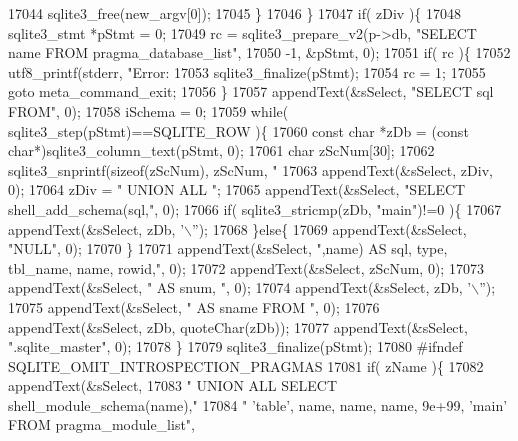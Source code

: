 \begin{DoxyCode}
{{{{{{{{{{{{{{{{{{{{{{{{{{{{{{{{{{{{{{{{{{{{{{{{{{{{{{{{{{{{{{{{{{{{{{{{{{{{{17044         sqlite3_free(new\_argv[0]);
17045       \}
17046     \}
17047     \textcolor{keywordflow}{if}( zDiv )\{
17048       sqlite3_stmt *pStmt = 0;
17049       rc = sqlite3_prepare_v2(p->db, \textcolor{stringliteral}{"SELECT name FROM pragma\_database\_list"},
17050                               -1, &pStmt, 0);
17051       \textcolor{keywordflow}{if}( rc )\{
17052         utf8_printf(stderr, \textcolor{stringliteral}{"Error: %
17053         sqlite3_finalize(pStmt);
17054         rc = 1;
17055         \textcolor{keywordflow}{goto} meta\_command\_exit;
17056       \}
17057       appendText(&sSelect, \textcolor{stringliteral}{"SELECT sql FROM"}, 0);
17058       iSchema = 0;
17059       \textcolor{keywordflow}{while}( sqlite3_step(pStmt)==SQLITE_ROW )\{
17060         \textcolor{keyword}{const} \textcolor{keywordtype}{char} *zDb = (\textcolor{keyword}{const} \textcolor{keywordtype}{char}*)sqlite3_column_text(pStmt, 0);
17061         \textcolor{keywordtype}{char} zScNum[30];
17062         sqlite3_snprintf(\textcolor{keyword}{sizeof}(zScNum), zScNum, \textcolor{stringliteral}{"%
17063         appendText(&sSelect, zDiv, 0);
17064         zDiv = \textcolor{stringliteral}{" UNION ALL "};
17065         appendText(&sSelect, \textcolor{stringliteral}{"SELECT shell\_add\_schema(sql,"}, 0);
17066         \textcolor{keywordflow}{if}( sqlite3_stricmp(zDb, \textcolor{stringliteral}{"main"})!=0 )\{
17067           appendText(&sSelect, zDb, \textcolor{charliteral}{'\(\backslash\)''});
17068         \}\textcolor{keywordflow}{else}\{
17069           appendText(&sSelect, \textcolor{stringliteral}{"NULL"}, 0);
17070         \}
17071         appendText(&sSelect, \textcolor{stringliteral}{",name) AS sql, type, tbl\_name, name, rowid,"}, 0);
17072         appendText(&sSelect, zScNum, 0);
17073         appendText(&sSelect, \textcolor{stringliteral}{" AS snum, "}, 0);
17074         appendText(&sSelect, zDb, \textcolor{charliteral}{'\(\backslash\)''});
17075         appendText(&sSelect, \textcolor{stringliteral}{" AS sname FROM "}, 0);
17076         appendText(&sSelect, zDb, quoteChar(zDb));
17077         appendText(&sSelect, \textcolor{stringliteral}{".sqlite\_master"}, 0);
17078       \}
17079       sqlite3_finalize(pStmt);
17080 \textcolor{preprocessor}{#ifndef SQLITE\_OMIT\_INTROSPECTION\_PRAGMAS}
17081       \textcolor{keywordflow}{if}( zName )\{
17082         appendText(&sSelect,
17083            \textcolor{stringliteral}{" UNION ALL SELECT shell\_module\_schema(name),"}
17084            \textcolor{stringliteral}{" 'table', name, name, name, 9e+99, 'main' FROM pragma\_module\_list"},
}}}}}}}}}}}}}}}}}}}}}}}}}}}}}}}}}}}}}}}}}}}}}}}}}}}}}}}}}}}}}}}}}}}}}}}}}}}}}}}
\end{DoxyCode}
